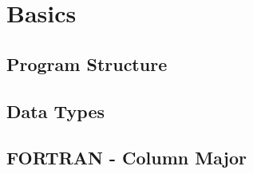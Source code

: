 \chapter{Basics}


\section{Program Structure}



\section{Data Types}



\section{FORTRAN - Column Major}





